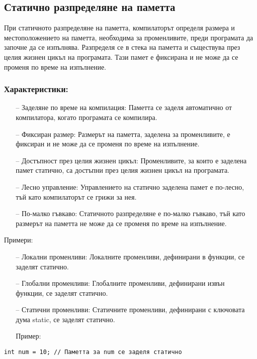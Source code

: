 \documentclass[oneside]{book}
\begin{document}
\subsection{Статично разпределяне на паметта}
При статичното разпределяне на паметта, компилаторът определя размера и местоположението на паметта, необходима за променливите, преди програмата да започне да се изпълнява. Разпределя се в стека на паметта и съществува през целия жизнен цикъл на програмата. Тази памет е фиксирана и не може да се променя по време на изпълнение.

\subsubsection{Характеристики:}
\begin{itemize}
    \item[--] Заделяне по време на компилация: Паметта се заделя автоматично от компилатора, когато програмата се компилира.
    \item[--] Фиксиран размер: Размерът на паметта, заделена за променливите, е фиксиран и не може да се променя по време на изпълнение.
    \item[--] Достъпност през целия жизнен цикъл: Променливите, за които е заделена памет статично, са достъпни през целия жизнен цикъл на програмата.
    \item[--] Лесно управление: Управлението на статично заделена памет е по-лесно, тъй като компилаторът се грижи за нея.
    \item[--] По-малко гъвкаво: Статичното разпределяне е по-малко гъвкаво, тъй като размерът на паметта не може да се променя по време на изпълнение.
\end{itemize}

Примери:
\begin{itemize}
    \item[--] Локални променливи: Локалните променливи, дефинирани в функции, се заделят статично.
    \item[--] Глобални променливи: Глобалните променливи, дефинирани извън функции, се заделят статично.
    \item[--] Статични променливи: Статичните променливи, дефинирани с ключовата дума static, се заделят статично.
\end{itemize}

\begin{itemize}\item[Пример:]\end{itemize}
\begin{mdframed}\begin{lstlisting}
int num = 10; // Паметта за num се заделя статично
\end{lstlisting}\end{mdframed}
\end{document}
